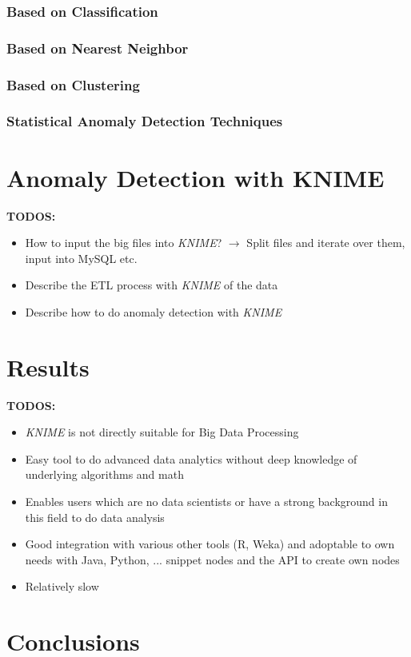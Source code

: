 \documentclass{dima}
\begin{document}
\subsubsection{Based on Classification}
\subsubsection{Based on Nearest Neighbor}
\subsubsection{Based on Clustering}
\subsubsection{Statistical Anomaly Detection Techniques}

\section{Anomaly Detection with KNIME}
\label{sec:ADwK}

\textbf{TODOS:}
\begin{itemize}
\item How to input the big files into \textit{KNIME}? $\rightarrow$ Split files and iterate over them, input into MySQL etc.
\item Describe the ETL process with \textit{KNIME} of the data
\item Describe how to do anomaly detection with \textit{KNIME}
\end{itemize}

\section{Results}
\textbf{TODOS:}
\begin{itemize}
\item \textit{KNIME} is not directly suitable for Big Data Processing
\item Easy tool to do advanced data analytics without deep knowledge of underlying algorithms and math
\item Enables users which are no data scientists or have a strong background in this field to do data analysis
\item Good integration with various other tools (R, Weka) and adoptable to own needs with Java, Python, ... snippet nodes and the API to create own nodes
\item Relatively slow
\end{itemize}


\section{Conclusions}



\end{document}
